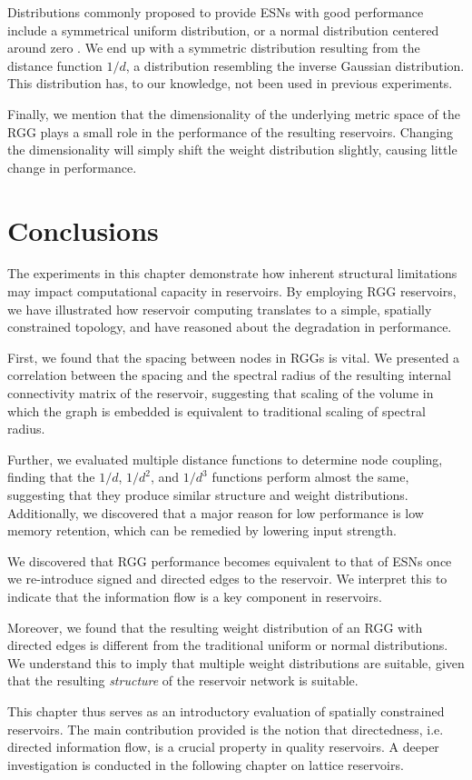 Distributions commonly proposed to provide ESNs with good performance include a
symmetrical uniform distribution, or a normal distribution centered around zero
\cite{montavon_practical_2012}. We end up with a symmetric distribution
resulting from the distance function $1/d$, a distribution resembling the
inverse Gaussian distribution. This distribution has, to our knowledge, not been
used in previous experiments.

Finally, we mention that the dimensionality of the underlying metric space of
the RGG plays a small role in the performance of the resulting
reservoirs. Changing the dimensionality will simply shift the weight
distribution slightly, causing little change in performance.

\section{Conclusions}

The experiments in this chapter demonstrate how inherent structural limitations
may impact computational capacity in reservoirs. By employing RGG reservoirs, we
have illustrated how reservoir computing translates to a simple, spatially
constrained topology, and have reasoned about the degradation in performance.

First, we found that the spacing between nodes in RGGs is vital. We presented a
correlation between the spacing and the spectral radius of the resulting
internal connectivity matrix of the reservoir, suggesting that scaling of the
volume in which the graph is embedded is equivalent to traditional scaling of
spectral radius.

Further, we evaluated multiple distance functions to determine node coupling,
finding that the $1/d$, $1/d^2$, and $1/d^3$ functions perform almost the same,
suggesting that they produce similar structure and weight
distributions. Additionally, we discovered that a major reason for low
performance is low memory retention, which can be remedied by lowering input
strength.

We discovered that RGG performance becomes equivalent to that of ESNs once we
re-introduce signed and directed edges to the reservoir. We interpret this to
indicate that the information flow is a key component in reservoirs.

Moreover, we found that the resulting weight distribution of an RGG with
directed edges is different from the traditional uniform or normal
distributions. We understand this to imply that multiple weight distributions
are suitable, given that the resulting \textit{structure} of the reservoir
network is suitable.

This chapter thus serves as an introductory evaluation of spatially constrained
reservoirs. The main contribution provided is the notion that directedness,
i.e. directed information flow, is a crucial property in quality reservoirs. A
deeper investigation is conducted in the following chapter on lattice
reservoirs.

